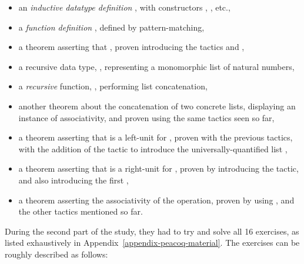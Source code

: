 \begin{itemize}

\item an \emph{inductive datatype definition} , with constructors
, , etc.,

\item a \emph{function definition} , defined by
pattern-matching,

\item a theorem asserting that , proven
introducing the tactics  and ,

\item a recursive data type, , representing a monomorphic
list of natural numbers,

\item a \emph{recursive} function, , performing list
concatenation,

\item another theorem about the concatenation of two concrete lists, displaying
an instance of associativity, and proven using the same tactics seen so far,

\item a theorem asserting that  is a left-unit for
, proven with the previous tactics, with the addition of the
 tactic to introduce the universally-quantified list
,

\item a theorem asserting that  is a right-unit for
, proven by introducing the  tactic, and
also introducing the first ,

\item a theorem asserting the associativity of the  operation,
proven by using , and the other tactics mentioned so far.

\end{itemize}

During the second part of the study, they had to try and solve all 16 exercises,
as listed exhaustively in Appendix~\ref{appendix-peacoq-material}.  The
exercises can be roughly described as follows:

